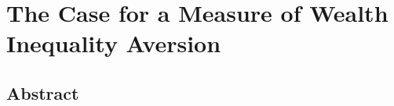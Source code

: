 \chapter{The Case for a Measure of Wealth Inequality Aversion}
\label{ch:ineq-meas}

\begingroup
\singlespacing
\section*{Abstract}

\endgroup








